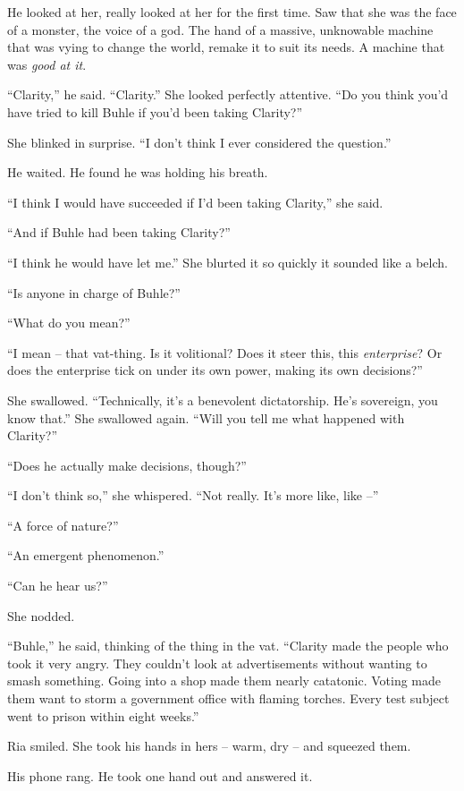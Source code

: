 He looked at her, really looked at her for the first time. Saw that she 
was the face of a monster, the voice of a god. The hand of a massive, 
unknowable machine that was vying to change the world, remake it to 
suit its needs. A machine that was \emph{good at it}.

“Clarity,” he said. “Clarity.” She looked perfectly attentive. 
“Do you think you'd have tried to kill Buhle if you'd been taking 
Clarity?”

She blinked in surprise. “I don't think I ever considered the 
question.”

He waited. He found he was holding his breath.

“I think I would have succeeded if I'd been taking Clarity,” she 
said.

“And if Buhle had been taking Clarity?”

“I think he would have let me.” She blurted it so quickly it 
sounded like a belch.

“Is anyone in charge of Buhle?”

“What do you mean?”

“I mean -- that vat-thing. Is it volitional? Does it steer this, this 
\emph{enterprise}? Or does the enterprise tick on under its own power, 
making its own decisions?”

She swallowed. “Technically, it's a benevolent dictatorship. He's 
sovereign, you know that.” She swallowed again. “Will you tell me 
what happened with Clarity?”

“Does he actually make decisions, though?”

“I don't think so,” she whispered. “Not really. It's more like, 
like --”

“A force of nature?”

“An emergent phenomenon.”

“Can he hear us?”

She nodded.

“Buhle,” he said, thinking of the thing in the vat. “Clarity made 
the people who took it very angry. They couldn't look at advertisements 
without wanting to smash something. Going into a shop made them nearly 
catatonic. Voting made them want to storm a government office with 
flaming torches. Every test subject went to prison within eight 
weeks.”

Ria smiled. She took his hands in hers -- warm, dry -- and squeezed 
them.

His phone rang. He took one hand out and answered it.

